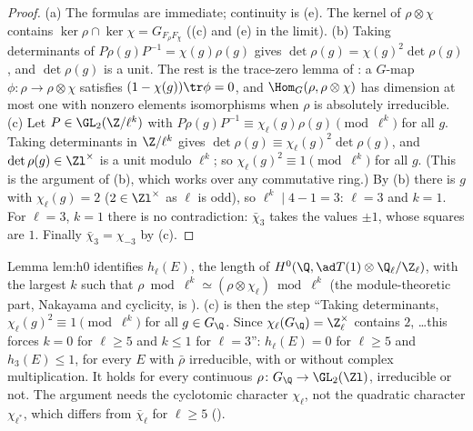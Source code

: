 \begin{proof}
(a) The formulas are immediate; continuity is (e). The kernel of $\rho\otimes\chi$ contains $\ker\rho\cap\ker\chi=G_{F_\rho F_\chi}$
((c) and (e) in the limit).
(b) Taking determinants of $P\rho(g)P^{-1}=\chi(g)\rho(g)$ gives $\det\rho(g)=\chi(g)^2\det\rho(g)$, and $\det\rho(g)$ is a unit. The rest is the trace-zero lemma of
: a $G$-map $\phi\colon\rho\to\rho\otimes\chi$ satisfies $(1-\chi(g))\tr\phi=0$, and $\Hom_G(\rho,\rho\otimes\chi)$ has dimension at most one with nonzero
elements isomorphisms when $\rho$ is absolutely irreducible.
(c) Let $P\in\GL_2(\Z/\ell^k)$ with $P\rho(g)P^{-1}\equiv\chi_\ell(g)\rho(g)\pmod{\ell^k}$ for all $g$. Taking determinants in $\Z/\ell^k$ gives
$\det\rho(g)\equiv\chi_\ell(g)^2\det\rho(g)$, and $\det\rho(g)\in\Zl^\times$ is a unit modulo $\ell^k$; so $\chi_\ell(g)^2\equiv1\pmod{\ell^k}$ for all $g$. (This is the
argument of (b), which works over any commutative ring.) By
(b) there is $g$ with $\chi_\ell(g)=2$ ($2\in\Zl^\times$ as $\ell$ is odd), so $\ell^k\mid4-1=3$: $\ell=3$ and $k=1$. For $\ell=3$, $k=1$ there is no contradiction: $\bar\chi_3$ takes the values $\pm1$, whose squares are $1$. Finally
$\bar\chi_3=\chi_{-3}$ by (c).
\end{proof}

\begin{paperlink}
Lemma lem:h0 identifies $h_\ell(E)$, the length of $H^0(\Q,\ad T(1)\otimes\Q_\ell/\Z_\ell)$, with the largest $k$ such that $\rho\bmod\ell^k\simeq(\rho\otimes\chi_\ell)
\bmod\ell^k$ (the module-theoretic part, Nakayama and cyclicity, is ). (c) is then the step ``Taking determinants,
$\chi_\ell(g)^2\equiv1\pmod{\ell^k}$ for all $g\in G_\Q$. Since $\chi_\ell(G_\Q)=\Z_\ell^\times$ contains $2$, \dots this forces $k=0$ for $\ell\ge5$ and $k\le1$ for
$\ell=3$'': $h_\ell(E)=0$ for $\ell\ge5$ and $h_3(E)\le1$, for every $E$ with $\bar\rho$ irreducible, with or without complex multiplication. It holds for every continuous
$\rho\colon G_\Q\to\GL_2(\Zl)$, irreducible or not. The argument needs the cyclotomic character $\chi_\ell$, not the quadratic character $\chi_{\ell^*}$, which differs from
$\bar\chi_\ell$ for $\ell\ge5$ ().
\end{paperlink}

